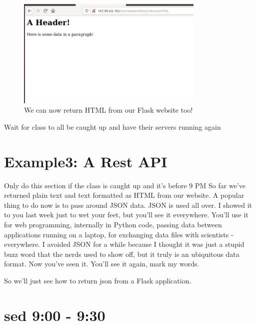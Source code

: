 \documentclass[10pt]{article}
\begin{document}
\begin{figure}[h]
  \centering
    \includegraphics[width=0.8\textwidth]{somewhereElse_returnsHTML.png}
  \caption{We can now return HTML from our Flask website too!}
\end{figure}

{\LARGE Wait for class to all be caught up and have their servers running again}

\section{Example3: A Rest API}
{\LARGE Only do this section if the class is caught up and it's before 9 PM}
So far we've returned plain text and text formatted as HTML from our website. A popular thing to do now is to pass around JSON data. JSON is used all over. I showed it to you last week just to wet your feet, but you'll see it everywhere. You'll use it for web programming, internally in Python code, passing data between applications running on a laptop, for exchanging data files with scientists - everywhere. I avoided JSON for a while because I thought it was just a stupid buzz word that the nerds used to show off, but it truly is an ubiquitous data format. Now you've seen it. You'll see it again, mark my words. 

So we'll just see how to return json from a Flask application.

\section{sed 9:00 - 9:30}
\end{document}
